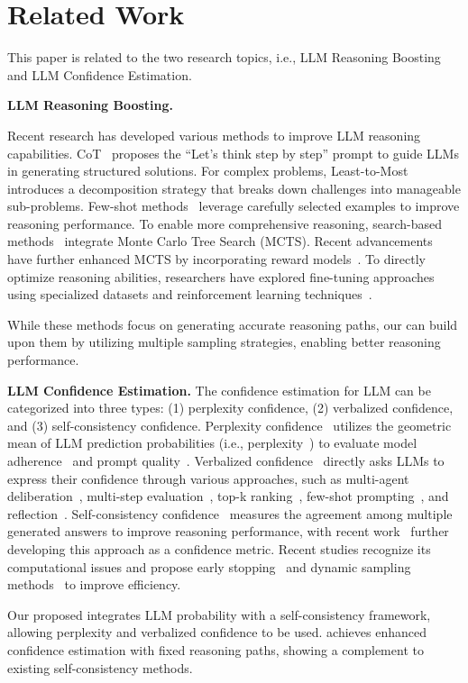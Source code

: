 \section{Related Work}

This paper is related to the two research topics, i.e., LLM Reasoning Boosting and LLM Confidence Estimation.

\textbf{LLM Reasoning Boosting.}

Recent research has developed various methods to improve LLM reasoning capabilities. CoT~\citep{kojima22large} proposes the ``Let's think step by step'' prompt to guide LLMs in generating structured solutions. For complex problems, Least-to-Most~\citep{zhou23least} introduces a decomposition strategy that breaks down challenges into manageable sub-problems. Few-shot methods~\citep{wei22cot,fu23complexity,zhang23automatic} leverage carefully selected examples to improve reasoning performance. To enable more comprehensive reasoning, search-based methods~\citep{guan2025rstar} integrate Monte Carlo Tree Search (MCTS). Recent advancements have further enhanced MCTS by incorporating reward models~\citep{zhang2024restmcts, park24ensembling}. To directly optimize reasoning abilities, researchers have explored fine-tuning approaches~\citep{yu24metamath, li24mugglemath, li2024neurosymbolic,ying2024internlmmath} using specialized datasets and reinforcement learning techniques~\citep{shao24deepseekmath,luo25wizardmath}.

While these methods focus on generating accurate reasoning paths, our \RPC can build upon them by utilizing multiple sampling strategies, enabling better reasoning performance.

\textbf{LLM Confidence Estimation.}
The confidence estimation for LLM can be categorized into three types: (1) perplexity confidence, (2) verbalized confidence, and (3) self-consistency confidence. Perplexity confidence~\citep{huang2023look,duan2024shifting} utilizes the geometric mean of LLM prediction probabilities (i.e., perplexity~\citep{chen1998evaluation, blei03LDA}) to evaluate model adherence~\citep{murugadoss2025evaluating} and prompt quality~\citep{yao2024learning}. Verbalized confidence~\citep{kadavath2022language, xiong2023can, tian2023just} directly asks LLMs to express their confidence through various approaches, such as multi-agent deliberation~\citep{yang2024confidence}, multi-step evaluation~\citep{xiong2023can}, top-k ranking~\citep{tian2023just}, few-shot prompting~\citep{liu2023calibrating}, and reflection~\citep{dhuliawala2023chain, zhao2024fact}. Self-consistency confidence~\citep{wang2022self, chen2023universal, cheng2024relic} measures the agreement among multiple generated answers to improve reasoning performance, with recent work~\citep{xiong2023can, yadkori2024believe, becker2024cycles} further developing this approach as a confidence metric. Recent studies recognize its computational issues and propose early stopping~\citep{li24escape} and dynamic sampling methods~\citep{wang24make, wang24dynamic, amad23adaptive} to improve efficiency. 

Our proposed \RPC integrates LLM probability with a self-consistency framework, allowing perplexity and verbalized confidence to be used. \RPC achieves enhanced confidence estimation with fixed reasoning paths, showing a complement to existing self-consistency methods.
